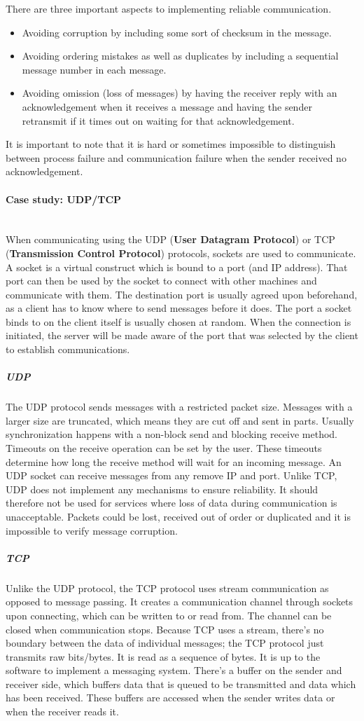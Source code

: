 \documentclass[a4paper]{article}
\newcommand{\subsubsubsection}[1]{\paragraph{#1}\mbox{}\\}
\begin{document}
There are three important aspects to implementing reliable communication.

\begin{itemize}
\item Avoiding corruption by including some sort of checksum in the message.
\item Avoiding ordering mistakes as well as duplicates by including a sequential message number in each message.
\item Avoiding omission (loss of messages) by having the receiver reply with an acknowledgement when it receives a message and having the sender retransmit if it times out on waiting for that acknowledgement.
\end{itemize}

It is important to note that it is hard or sometimes impossible to distinguish between process failure and communication failure when the sender received no acknowledgement.

\subsubsubsection{Case study: UDP/TCP}

When communicating using the UDP (\textbf{User Datagram Protocol}) or TCP (\textbf{Transmission Control Protocol}) protocols, sockets are used to communicate. A socket is a virtual construct which is bound to a port (and IP address). That port can then be used by the socket to connect with other machines and communicate with them. The destination port is usually agreed upon beforehand, as a client has to know where to send messages before it does. The port a socket binds to on the client itself is usually chosen at random. When the connection is initiated, the server will be made aware of the port that was selected by the client to establish communications.

\subparagraph*{UDP} The UDP protocol sends messages with a restricted packet size. Messages with a larger size are truncated, which means they are cut off and sent in parts. Usually synchronization happens with a non-block send and blocking receive method. Timeouts on the receive operation can be set by the user. These timeouts determine how long the receive method will wait for an incoming message. An UDP socket can receive messages from any remove IP and port. Unlike TCP, UDP does not implement any mechanisms to ensure reliability. It should therefore not be used for services where loss of data during communication is unacceptable. Packets could be lost, received out of order or duplicated and it is impossible to verify message corruption.

\subparagraph*{TCP} Unlike the UDP protocol, the TCP protocol uses stream communication as opposed to message passing. It creates a communication channel through sockets upon connecting, which can be written to or read from. The channel can be closed when communication stops. Because TCP uses a stream, there's no boundary between the data of individual messages; the TCP protocol just transmits raw bits/bytes. It is read as a sequence of bytes. It is up to the software to implement a messaging system. There's a buffer on the sender and receiver side, which buffers data that is queued to be transmitted and data which has been received. These buffers are accessed when the sender writes data or when the receiver reads it.
\end{document}
